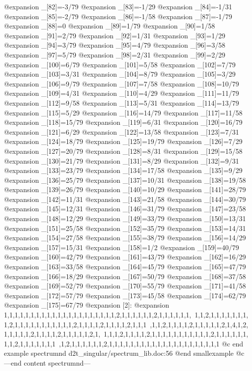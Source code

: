 @expansion{}    _[82]=-3/79
@expansion{}    _[83]=-1/29
@expansion{}    _[84]=-1/31
@expansion{}    _[85]=-2/79
@expansion{}    _[86]=-1/58
@expansion{}    _[87]=-1/79
@expansion{}    _[88]=0
@expansion{}    _[89]=1/79
@expansion{}    _[90]=1/58
@expansion{}    _[91]=2/79
@expansion{}    _[92]=1/31
@expansion{}    _[93]=1/29
@expansion{}    _[94]=3/79
@expansion{}    _[95]=4/79
@expansion{}    _[96]=3/58
@expansion{}    _[97]=5/79
@expansion{}    _[98]=2/31
@expansion{}    _[99]=2/29
@expansion{}    _[100]=6/79
@expansion{}    _[101]=5/58
@expansion{}    _[102]=7/79
@expansion{}    _[103]=3/31
@expansion{}    _[104]=8/79
@expansion{}    _[105]=3/29
@expansion{}    _[106]=9/79
@expansion{}    _[107]=7/58
@expansion{}    _[108]=10/79
@expansion{}    _[109]=4/31
@expansion{}    _[110]=4/29
@expansion{}    _[111]=11/79
@expansion{}    _[112]=9/58
@expansion{}    _[113]=5/31
@expansion{}    _[114]=13/79
@expansion{}    _[115]=5/29
@expansion{}    _[116]=14/79
@expansion{}    _[117]=11/58
@expansion{}    _[118]=15/79
@expansion{}    _[119]=6/31
@expansion{}    _[120]=16/79
@expansion{}    _[121]=6/29
@expansion{}    _[122]=13/58
@expansion{}    _[123]=7/31
@expansion{}    _[124]=18/79
@expansion{}    _[125]=19/79
@expansion{}    _[126]=7/29
@expansion{}    _[127]=20/79
@expansion{}    _[128]=8/31
@expansion{}    _[129]=15/58
@expansion{}    _[130]=21/79
@expansion{}    _[131]=8/29
@expansion{}    _[132]=9/31
@expansion{}    _[133]=23/79
@expansion{}    _[134]=17/58
@expansion{}    _[135]=9/29
@expansion{}    _[136]=25/79
@expansion{}    _[137]=10/31
@expansion{}    _[138]=19/58
@expansion{}    _[139]=26/79
@expansion{}    _[140]=10/29
@expansion{}    _[141]=28/79
@expansion{}    _[142]=11/31
@expansion{}    _[143]=21/58
@expansion{}    _[144]=30/79
@expansion{}    _[145]=12/31
@expansion{}    _[146]=31/79
@expansion{}    _[147]=23/58
@expansion{}    _[148]=12/29
@expansion{}    _[149]=33/79
@expansion{}    _[150]=13/31
@expansion{}    _[151]=25/58
@expansion{}    _[152]=35/79
@expansion{}    _[153]=14/31
@expansion{}    _[154]=27/58
@expansion{}    _[155]=38/79
@expansion{}    _[156]=14/29
@expansion{}    _[157]=15/31
@expansion{}    _[158]=1/2
@expansion{}    _[159]=40/79
@expansion{}    _[160]=42/79
@expansion{}    _[161]=43/79
@expansion{}    _[162]=16/29
@expansion{}    _[163]=33/58
@expansion{}    _[164]=45/79
@expansion{}    _[165]=47/79
@expansion{}    _[166]=18/29
@expansion{}    _[167]=50/79
@expansion{}    _[168]=37/58
@expansion{}    _[169]=52/79
@expansion{}    _[170]=55/79
@expansion{}    _[171]=41/58
@expansion{}    _[172]=57/79
@expansion{}    _[173]=45/58
@expansion{}    _[174]=62/79
@expansion{}    _[175]=67/79
@expansion{} [2]:
@expansion{}    1,1,1,1,1,1,1,1,1,1,1,1,1,1,1,1,1,1,1,1,1,2,1,1,1,1,1,1,2,1,1,1,1,1,1,\
   1,1,2,1,1,1,1,1,1,1,1,2,1,1,1,1,1,1,1,1,1,1,1,2,1,1,1,1,2,1,1,1,1,2,1,1,1\
   ,1,1,2,1,1,1,1,2,1,1,1,1,1,2,1,4,1,2,1,1,1,1,1,2,1,1,1,1,2,1,1,1,1,1,2,1,\
   1,1,1,2,1,1,1,1,2,1,1,1,1,1,1,1,1,1,1,1,2,1,1,1,1,1,1,1,1,2,1,1,1,1,1,1,1\
   ,1,2,1,1,1,1,1,1,2,1,1,1,1,1,1,1,1,1,1,1,1,1,1,1,1,1,1,1,1,1
@c end example spectrumnd d2t_singular/spectrum_lib.doc:56
@end smallexample
@c ---end content spectrumnd---
